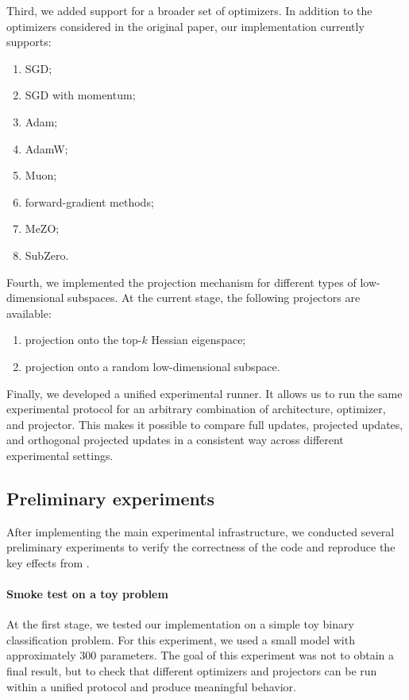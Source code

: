 \documentclass[conference]{IEEEtran}
\begin{document}
Third, we added support for a broader set of optimizers. In addition to the optimizers considered in the original paper, our implementation currently supports:
\begin{enumerate}
    \item SGD;
    \item SGD with momentum;
    \item Adam;
    \item AdamW;
    \item Muon;
    \item forward-gradient methods;
    \item MeZO;
    \item SubZero.
\end{enumerate}

Fourth, we implemented the projection mechanism for different types of low-dimensional subspaces. At the current stage, the following projectors are available:
\begin{enumerate}
    \item projection onto the top-$k$ Hessian eigenspace;
    \item projection onto a random low-dimensional subspace.
\end{enumerate}

Finally, we developed a unified experimental runner. It allows us to run the same experimental protocol for an arbitrary combination of architecture, optimizer, and projector. This makes it possible to compare full updates, projected updates, and orthogonal projected updates in a consistent way across different experimental settings.

\subsection{Preliminary experiments}

After implementing the main experimental infrastructure, we conducted several preliminary experiments to verify the correctness of the code and reproduce the key effects from \citet{SongDoesSGD}.

\paragraph{Smoke test on a toy problem}

At the first stage, we tested our implementation on a simple toy binary classification problem. For this experiment, we used a small model with approximately 300 parameters. The goal of this experiment was not to obtain a final result, but to check that different optimizers and projectors can be run within a unified protocol and produce meaningful behavior.
\end{document}
